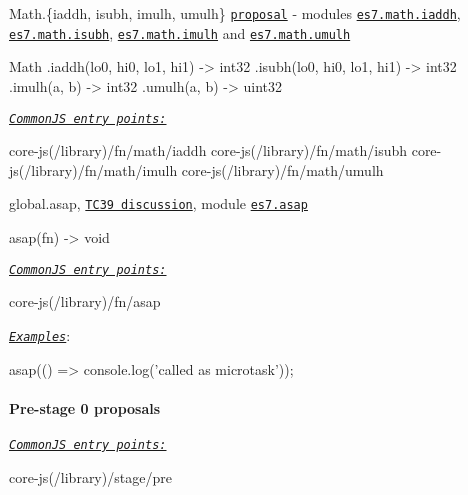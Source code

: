 \begin{DoxyItemize}
\item {\ttfamily Math.\{iaddh, isubh, imulh, umulh\}} \href{https://gist.github.com/BrendanEich/4294d5c212a6d2254703}{\tt proposal} -\/ modules \href{https://github.com/zloirock/core-js/blob/v2.6.0/modules/es7.math.iaddh.js}{\tt {\ttfamily es7.\+math.\+iaddh}}, \href{https://github.com/zloirock/core-js/blob/v2.6.0/modules/es7.math.isubh.js}{\tt {\ttfamily es7.\+math.\+isubh}}, \href{https://github.com/zloirock/core-js/blob/v2.6.0/modules/es7.math.imulh.js}{\tt {\ttfamily es7.\+math.\+imulh}} and \href{https://github.com/zloirock/core-js/blob/v2.6.0/modules/es7.math.umulh.js}{\tt {\ttfamily es7.\+math.\+umulh}} 
\begin{DoxyCode}
Math
  .iaddh(lo0, hi0, lo1, hi1) -> int32
  .isubh(lo0, hi0, lo1, hi1) -> int32
  .imulh(a, b) -> int32
  .umulh(a, b) -> uint32
\end{DoxyCode}
 \href{#commonjs}{\tt {\itshape Common\+JS entry points\+:}} 
\begin{DoxyCode}
core-js(/library)/fn/math/iaddh
core-js(/library)/fn/math/isubh
core-js(/library)/fn/math/imulh
core-js(/library)/fn/math/umulh
\end{DoxyCode}

\item {\ttfamily global.\+asap}, \href{https://github.com/rwaldron/tc39-notes/blob/master/es6/2014-09/sept-25.md#510-globalasap-for-enqueuing-a-microtask}{\tt T\+C39 discussion}, module \href{https://github.com/zloirock/core-js/blob/v2.6.0/modules/es7.asap.js}{\tt {\ttfamily es7.\+asap}} 
\begin{DoxyCode}
asap(fn) -> void
\end{DoxyCode}
 \href{#commonjs}{\tt {\itshape Common\+JS entry points\+:}} 
\begin{DoxyCode}
core-js(/library)/fn/asap
\end{DoxyCode}
 \href{http://goo.gl/tx3SRK}{\tt {\itshape Examples}}\+: 
\begin{DoxyCode}
asap(() => console.log('called as microtask'));
\end{DoxyCode}

\end{DoxyItemize}

\paragraph*{Pre-\/stage 0 proposals}

\href{#commonjs}{\tt {\itshape Common\+JS entry points\+:}} 
\begin{DoxyCode}
core-js(/library)/stage/pre
\end{DoxyCode}

